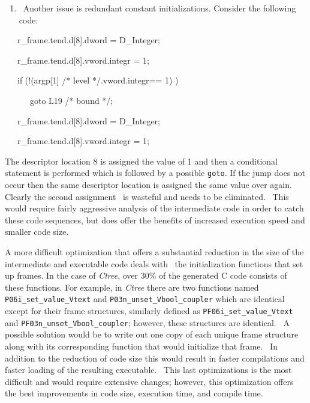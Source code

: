 \liststyleLxlii
\begin{enumerate}
\item 
\ Another issue is redundant constant initializations. Consider the following code:
\end{enumerate}
{\ttfamily\mdseries
\ \ \ r\_frame.tend.d[8].dword = D\_Integer;}

{\ttfamily\mdseries
\ \ \ r\_frame.tend.d[8].vword.integr = 1;}

{\ttfamily\mdseries
\ \ \ if (!(argp[1] /* level */.vword.integr== 1) )}

{\ttfamily\mdseries
\ \ \ \ \ \ goto L19 /* bound */;}

{\ttfamily\mdseries
\ \ \ r\_frame.tend.d[8].dword = D\_Integer;}

{\ttfamily\mdseries
\ \ \ r\_frame.tend.d[8].vword.integr = 1;}


The descriptor location 8 is assigned the value of 1 and then a conditional statement is performed which is followed by
a possible \texttt{goto}. If the jump does not occur then the same descriptor location is assigned the same value over
again. Clearly the second assignment \ is wasteful and needs to be eliminated. \ This would require fairly aggressive
analysis of the intermediate code in order to catch these code sequences, but does offer the benefits of increased
execution speed and smaller code size.


A more difficult optimization that offers a substantial reduction in the size of the intermediate and executable code
deals with \ the initialization functions that set up frames. In the case of \textit{Ctree}, over 30\% of the generated
C code consists of these functions. For example, in \textit{Ctree} there are two functions named
\texttt{P06i\_set\_value\_Vtext} and \texttt{P03n\_unset\_Vbool\_coupler} which are identical except for their frame
structures, similarly defined as \texttt{PF06i\_set\_value\_Vtext} and \texttt{PF03n\_unset\_Vbool\_coupler}; however,
these structures are identical. \ A possible solution would be to write out one copy of each unique frame structure
along with its corresponding function that would initialize that frame. \ In addition to the reduction of code size
this would result in faster compilations and faster loading of the resulting executable. \ This last optimizations is
the most difficult and would require extensive changes; however, this optimization offers the best improvements in code
size, execution time, and compile time.
